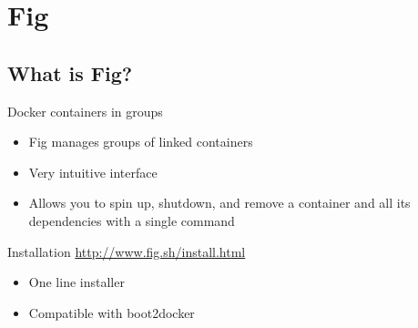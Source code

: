 \documentclass{beamer}
\begin{document}
    \section{Fig}
    \subsection{What is Fig?}
    \begin{frame}{Docker containers in groups}
        \begin{itemize}
            \item Fig manages groups of linked containers
            \item Very intuitive interface
            \item Allows you to spin up, shutdown, and remove a container and all its dependencies with a single command
        \end{itemize}
    \end{frame}
    \begin{frame}{Installation}
        \href{http://www.fig.sh/install.html}{http://www.fig.sh/install.html}
        \begin{itemize}
            \item One line installer
            \item Compatible with boot2docker
        \end{itemize}
    \end{frame}
\end{document}
